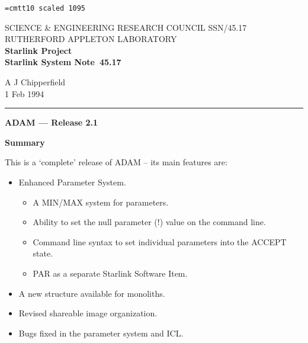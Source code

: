 \pagestyle{myheadings}

\newcommand{\stardoccategory}  {Starlink System Note}
\newcommand{\stardocinitials}  {SSN}
\newcommand{\stardocnumber}    {45.17}
\newcommand{\stardocauthors}   {A J Chipperfield}
\newcommand{\stardocdate}      {1 Feb 1994}
\newcommand{\stardoctitle}     {ADAM --- Release 2.1}

\newcommand{\stardocname}{\stardocinitials /\stardocnumber}
\markright{\stardocname}
\setlength{\textwidth}{160mm}
\setlength{\textheight}{230mm}
\setlength{\topmargin}{-2mm}
\setlength{\oddsidemargin}{0mm}
\setlength{\evensidemargin}{0mm}
\setlength{\parindent}{0mm}
\setlength{\parskip}{\medskipamount}
\setlength{\unitlength}{1mm}


\font\tt=cmtt10 scaled 1095
\renewcommand{\_}{{\tt\char'137}}


\thispagestyle{empty}
SCIENCE \& ENGINEERING RESEARCH COUNCIL \hfill \stardocname\\
RUTHERFORD APPLETON LABORATORY\\
{\large\bf Starlink Project\\}
{\large\bf \stardoccategory\ \stardocnumber}
\begin{flushright}
\stardocauthors\\
\stardocdate
\end{flushright}
\vspace{-4mm}
\rule{\textwidth}{0.5mm}
\vspace{5mm}
\begin{center}
{\Large\bf \stardoctitle}
\end{center}
\vspace{20mm}
\begin{center}
{\Large\bf Summary}
\end{center}
This is a `complete' release of ADAM -- its main features are:
\begin{itemize}
\item Enhanced Parameter System.
\begin{itemize}
\item A MIN/MAX system for parameters.
\item Ability to set the null parameter (!) value on the command line.
\item Command line syntax to set individual parameters into the ACCEPT state.
\item PAR as a separate Starlink Software Item.
\end{itemize}
\item A new structure available for monoliths.
\item Revised shareable image organization.
\item Bugs fixed in the parameter system and ICL.
\end{itemize}

